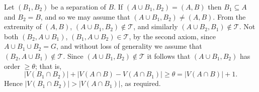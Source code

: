Let $(B_1, B_2)$ be a separation of $B$. If $(A\cup B_1, B_2) = (A, B)$ then $B_1\subseteq A$ and $B_2 = B$, and so we may assume that $(A\cup B_1, B_2)\ne (A, B)$. From the extremity of $(A, B)$, $(A\cup B_1, B_2)\notin \mathscr{T}$, and similarly $(A\cup B_2, B_1)\notin \mathscr{T}$. Not both $(B_2, A\cup B_1)$, $(B_1, A\cup B_2)\in \mathscr{T}$, by the second axiom, since $A\cup B_1\cup B_2 = G$, and without loss of generality we assume that $(B_2, A\cup B_1)\notin \mathscr{T}$. Since $(A\cup B_1, B_2)\notin \mathscr{T}$ it follows that $(A\cup B_1, B_2)$ has order $\ge \theta$; that is,
\begin{equation*}
|V(B_1\cap B_2)| + |V(A\cap B) - V(A\cap B_1)| \ge \theta = |V(A\cap B)| + 1.
\end{equation*}
Hence $|V(B_1\cap B_2)| > |V(A\cap B_1)|$, as required.
